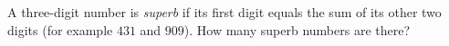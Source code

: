 A three-digit number is \emph{superb} if its first digit equals the sum of its other two digits (for example $431$ and $909$). How many superb numbers are there?
